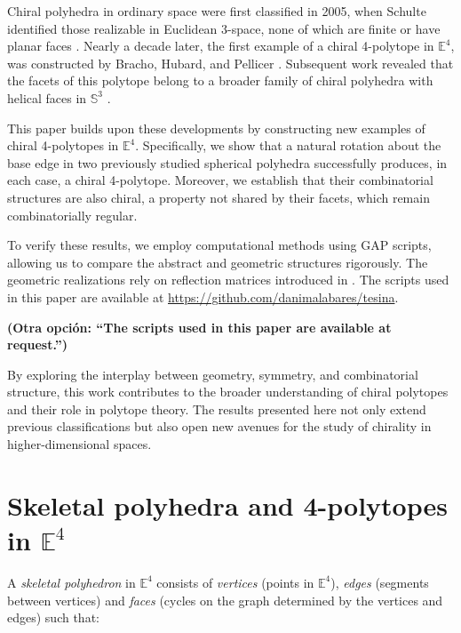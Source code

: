\documentclass{amsart}
\begin{document}
Chiral polyhedra in ordinary space were first  classified in 2005, when Schulte
identified those realizable in Euclidean 3-space, none of which are finite or
have planar faces \cite{chiral-polyhedra-i,chiral-polyhedra-ii}. Nearly a decade
later, the first example of a chiral 4-polytope in $\mathbb{E}^4$, was
constructed by Bracho, Hubard, and Pellicer \cite{rolis-cube}.  Subsequent work
revealed that the facets of this polytope belong to a broader family of chiral
polyhedra with helical faces in $\mathbb{S}^3$ \cite{petcox}.


This paper builds upon these developments by constructing new examples of chiral
4-polytopes in $\mathbb{E}^4$.  Specifically, we show that a natural rotation
about the base edge in two previously studied spherical polyhedra successfully
produces, in each case, a chiral 4-polytope.  Moreover, we establish that their
combinatorial structures are also chiral, a property not shared by their facets,
which remain combinatorially regular.

To verify these results, we employ computational methods using GAP scripts,
allowing us to compare the abstract and geometric structures rigorously. The
geometric realizations rely on reflection matrices introduced in
\cite{petcox}.%
The scripts used in this paper are available at 
\href{https://github.com/danimalabares/tesina}
{https://github.com/danimalabares/tesina}.

{\bf 
(Otra opción: ``The scripts used in this paper are available at request.'')}

By exploring the interplay between geometry, symmetry, and combinatorial
structure, this work contributes to the broader understanding of chiral
polytopes and their role in polytope theory.  The results presented here not
only extend previous classifications but also open new avenues for the study of
chirality in higher-dimensional spaces.
	
\section{Skeletal polyhedra and 4-polytopes in $\mathbb{E}^4$}
\label{section-skeletal-polyhedra-and-4-polytopes-in-E4}

A \textit{skeletal polyhedron} in $\mathbb{E}^4$ consists of \textit{vertices}
(points in $\mathbb{E}^4$), \textit{edges} (segments between vertices) and
\textit{faces} (cycles on the graph determined by the vertices and edges) such
that:
    
\end{document}

